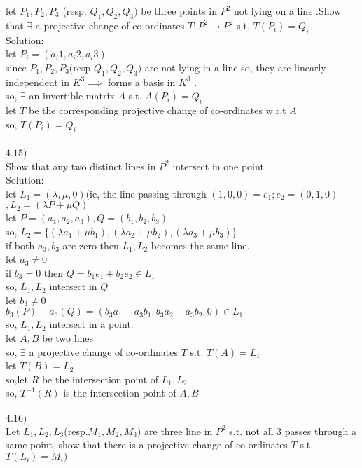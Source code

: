 \documentclass[11pt]{article}
\begin{document}
let $P_1,P_2,P_3$ (resp. $Q_1,Q_2,Q_3)$ be three points in $P^2$ not lying on a line .Show that $\exists$ a projective change of co-ordinates $T:P^2\to P^2$ s.t. $T(P_i)=Q_i$\\
Solution:\\
let $P_i=(a_i1,a_i2,a_i3)$ \\
since $P_1,P_2,P_3$(resp $Q_1,Q_2,Q_3)$ are not lying in a line so, they are linearly independent in $K^3\implies $ forms a basis in $K^3$ .\\
so, $\exists$ an invertible matrix $A$ s.t. $A(P_i)=Q_i$\\
let $T$ be the corresponding projective change of co-ordinates w.r.t $A$\\
so, $T(P_i)=Q_i$\\\\
$4.15$)\\
Show that any two distinct lines in $P^2$ intersect in one point.\\
Solution:\\
let $L_1=(\lambda,\mu,0)$(ie, the line passing through $(1,0,0)=e_1;e_2=(0,1,0)$ $,L_2=(\lambda P+\mu Q)$\\
let $P=(a_1,a_2,a_3),Q=(b_1,b_2,b_3)$\\
so, $L_2=\{(\lambda a_1+\mu b_1),(\lambda a_2+\mu b_2),(\lambda a_3+\mu b_3)\}$\\
if both $a_3,b_3$ are zero then $L_1,L_2$ becomes the same line.\\
let $a_3\neq 0$\\
if $b_3=0$ then $Q=b_1 e_1+b_2 e_2\in L_1$\\
so, $L_1,L_2$ intersect in $Q$\\
let $b_3\neq 0$\\
$b_3(P)-a_3(Q)=(b_3a_1-a_3b_1,b_3a_2-a_3b_2,0)\in L_1$\\
so, $L_1,L_2$ intersect in a point.\\
let $A,B$ be two lines \\
so, $\exists$ a projective change of co-ordinates $T$ s.t. $T(A)=L_1$\\
let $T(B)=L_2$\\
so,let $R$ be the intersection point of $L_1,L_2$\\
so, $T^{-1}(R)$ is the intersection point of $A,B$\\\\
$4.16)$\\
Let $L_1,L_2,L_3$(resp.$M_1,M_2,M_3)$ are three line in $P^2$ s.t. not all $3$ passes through a same point .show that there is a projective change of co-ordinates $T$ s.t. $T(L_i)=M_i)$\\
\end{document}
